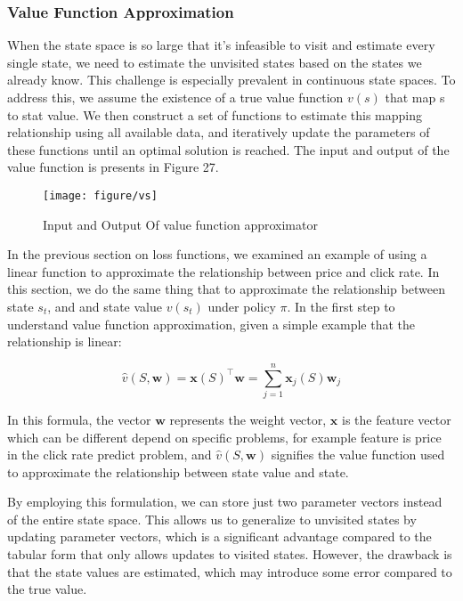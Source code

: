 \documentclass{article}
\begin{document}
\newpage
\subsubsection{Value Function Approximation}
When the state space is so large that it's infeasible to visit and estimate every single state, we need to estimate the unvisited states based on the states we already know. This challenge is especially prevalent in continuous state spaces. To address this, we assume the existence of a true value function $v(s)$ that map s to stat value. We then construct a set of functions to estimate this mapping relationship using all available data, and iteratively update the parameters of these functions until an optimal solution is reached. The input and output of the value function is presents in Figure 27.

\begin{figure}[htbp]
        \centering
        \texttt{[image: figure/vs]}
        \caption{Input and Output Of value function approximator}
\end{figure}

In the previous section on loss functions, we examined an example of using a linear function to approximate the relationship between price and click rate. In this section, we do the same thing that to approximate the relationship between state $s_t$, and and state value $v(s_t)$ under policy $\pi$. In the first step to understand value function approximation, given a simple example that the relationship is linear:


\begin{equation}
\hat{v}(S, \mathbf{w})=\mathbf{x}(S)^{\top} \mathbf{w}=\sum_{j=1}^n \mathbf{x}_j(S) \mathbf{w}_j
\end{equation}

In this formula, the vector $\mathbf{w}$ represents the weight vector, $\mathbf{x}$ is the feature vector which can be different depend on specific problems, for example feature is price in the click rate predict problem, and $\hat{v}(S,\mathbf{w})$ signifies the value function used to approximate the relationship between state value and state.

By employing this formulation, we can store just two parameter vectors instead of the entire state space. This allows us to generalize to unvisited states by updating parameter vectors, which is a significant advantage compared to the tabular form that only allows updates to visited states. However, the drawback is that the state values are estimated, which may introduce some error compared to the true value.
\end{document}
